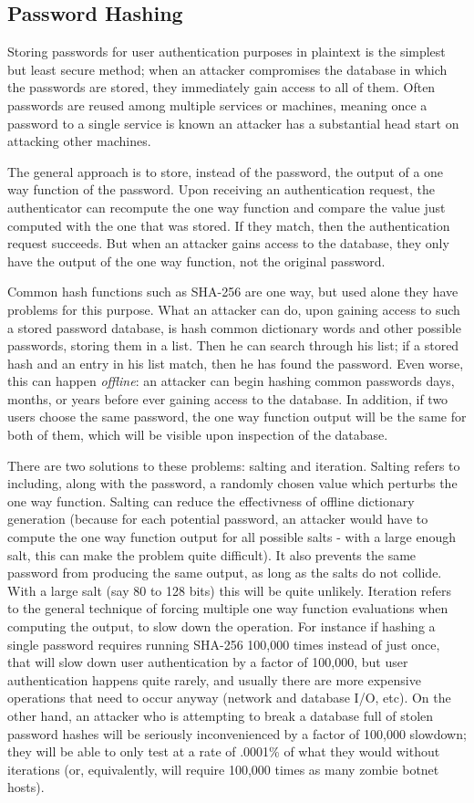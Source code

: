 \documentclass{article}
\begin{document}
\subsection{Password Hashing}

Storing passwords for user authentication purposes in plaintext is the
simplest but least secure method; when an attacker compromises the
database in which the passwords are stored, they immediately gain
access to all of them. Often passwords are reused among multiple
services or machines, meaning once a password to a single service is
known an attacker has a substantial head start on attacking other
machines.

The general approach is to store, instead of the password, the output
of a one way function of the password. Upon receiving an
authentication request, the authenticator can recompute the one way
function and compare the value just computed with the one that was
stored. If they match, then the authentication request succeeds. But
when an attacker gains access to the database, they only have the
output of the one way function, not the original password.

Common hash functions such as SHA-256 are one way, but used alone they
have problems for this purpose. What an attacker can do, upon gaining
access to such a stored password database, is hash common dictionary
words and other possible passwords, storing them in a list. Then he
can search through his list; if a stored hash and an entry in his list
match, then he has found the password. Even worse, this can happen
\emph{offline}: an attacker can begin hashing common passwords days,
months, or years before ever gaining access to the database. In
addition, if two users choose the same password, the one way function
output will be the same for both of them, which will be visible upon
inspection of the database.

There are two solutions to these problems: salting and
iteration. Salting refers to including, along with the password, a
randomly chosen value which perturbs the one way function. Salting can
reduce the effectivness of offline dictionary generation (because for
each potential password, an attacker would have to compute the one way
function output for all possible salts - with a large enough salt,
this can make the problem quite difficult). It also prevents the same
password from producing the same output, as long as the salts do not
collide. With a large salt (say 80 to 128 bits) this will be quite
unlikely. Iteration refers to the general technique of forcing
multiple one way function evaluations when computing the output, to
slow down the operation. For instance if hashing a single password
requires running SHA-256 100,000 times instead of just once, that will
slow down user authentication by a factor of 100,000, but user
authentication happens quite rarely, and usually there are more
expensive operations that need to occur anyway (network and database
I/O, etc). On the other hand, an attacker who is attempting to break a
database full of stolen password hashes will be seriously
inconvenienced by a factor of 100,000 slowdown; they will be able to
only test at a rate of .0001\% of what they would without iterations
(or, equivalently, will require 100,000 times as many zombie botnet
hosts).
\end{document}
